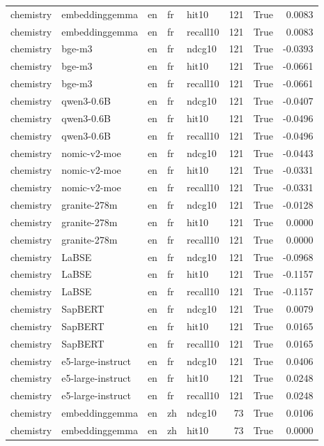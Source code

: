 \begin{tabular}{lllllrrr}
chemistry & embeddinggemma & en & fr & hit10 & 121 & True & 0.0083 \\
chemistry & embeddinggemma & en & fr & recall10 & 121 & True & 0.0083 \\
chemistry & bge-m3 & en & fr & ndcg10 & 121 & True & -0.0393 \\
chemistry & bge-m3 & en & fr & hit10 & 121 & True & -0.0661 \\
chemistry & bge-m3 & en & fr & recall10 & 121 & True & -0.0661 \\
chemistry & qwen3-0.6B & en & fr & ndcg10 & 121 & True & -0.0407 \\
chemistry & qwen3-0.6B & en & fr & hit10 & 121 & True & -0.0496 \\
chemistry & qwen3-0.6B & en & fr & recall10 & 121 & True & -0.0496 \\
chemistry & nomic-v2-moe & en & fr & ndcg10 & 121 & True & -0.0443 \\
chemistry & nomic-v2-moe & en & fr & hit10 & 121 & True & -0.0331 \\
chemistry & nomic-v2-moe & en & fr & recall10 & 121 & True & -0.0331 \\
chemistry & granite-278m & en & fr & ndcg10 & 121 & True & -0.0128 \\
chemistry & granite-278m & en & fr & hit10 & 121 & True & 0.0000 \\
chemistry & granite-278m & en & fr & recall10 & 121 & True & 0.0000 \\
chemistry & LaBSE & en & fr & ndcg10 & 121 & True & -0.0968 \\
chemistry & LaBSE & en & fr & hit10 & 121 & True & -0.1157 \\
chemistry & LaBSE & en & fr & recall10 & 121 & True & -0.1157 \\
chemistry & SapBERT & en & fr & ndcg10 & 121 & True & 0.0079 \\
chemistry & SapBERT & en & fr & hit10 & 121 & True & 0.0165 \\
chemistry & SapBERT & en & fr & recall10 & 121 & True & 0.0165 \\
chemistry & e5-large-instruct & en & fr & ndcg10 & 121 & True & 0.0406 \\
chemistry & e5-large-instruct & en & fr & hit10 & 121 & True & 0.0248 \\
chemistry & e5-large-instruct & en & fr & recall10 & 121 & True & 0.0248 \\
chemistry & embeddinggemma & en & zh & ndcg10 & 73 & True & 0.0106 \\
chemistry & embeddinggemma & en & zh & hit10 & 73 & True & 0.0000 \\

\end{tabular}

